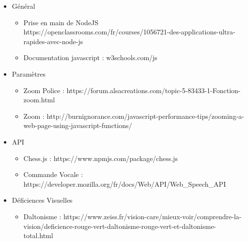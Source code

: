 \documentclass[12pt, openany]{report}
\begin{document}
\begin{itemize}
    \item Général \begin{itemize}
        \item Prise en main de NodeJS
https://openclassrooms.com/fr/courses/1056721-des-applications-ultra-rapides-avec-node-js
        \item Documentation javascript : w3schools.com/js
    \end{itemize}
    \item Paramètres \begin{itemize}
        \item Zoom Police :
https://forum.alsacreations.com/topic-5-83433-1-Fonction-zoom.html
    \item Zoom :
http://burnignorance.com/javascript-performance-tips/zooming-a-web-page-using-javascript-functions/
    \end{itemize}
    \item API \begin{itemize}
        \item Chess.js :
https://www.npmjs.com/package/chess.js
        \item Commande Vocale :
https://developer.mozilla.org/fr/docs/Web/API/Web\_Speech\_API
    \end{itemize}
    \item Déficiences Visuelles \begin{itemize}
        \item Daltonisme :
https://www.zeiss.fr/vision-care/mieux-voir/comprendre-la-vision/deficience-rouge-vert-daltonisme-rouge-vert-et-daltonisme-total.html
    \end{itemize}
\end{itemize}
\end{document}
